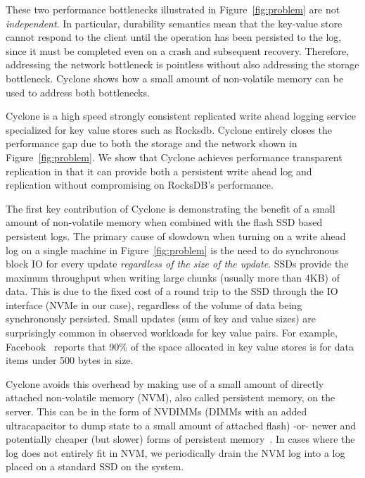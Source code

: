 \documentclass[pageno]{jpaper}
\begin{document}
These two performance bottlenecks illustrated in Figure~\ref{fig:problem} are
not \emph{independent}. In particular, durability semantics mean that the
key-value store  cannot respond to the client until the operation has been
persisted to the log, since it must be completed even on a crash and subsequent
recovery. Therefore, addressing the network bottleneck is pointless without also
addressing the storage bottleneck. Cyclone shows how a small amount of
non-volatile memory can be used to address both bottlenecks.

Cyclone is a high speed strongly consistent replicated write ahead logging
service specialized for key value stores such as Rocksdb. Cyclone entirely
closes the performance gap due to both the storage and the network shown in
Figure~\ref{fig:problem}. We show that Cyclone achieves performance transparent
replication in that it can provide both a persistent write ahead log and
replication without compromising on RocksDB's performance.

The first key contribution of Cyclone is demonstrating the benefit of a small
amount of non-volatile memory when combined with the flash SSD based persistent
logs.  The primary cause of slowdown when turning on a write ahead log on a
single machine in Figure~\ref{fig:problem} is the need to do synchronous block
IO for every update \emph{regardless of the size of the update}. SSDs provide
the maximum throughput when writing large chunks (usually more than 4KB) of
data. This is due to the fixed cost of a round trip to the SSD through the IO
interface (NVMe in our case), regardless of the volume of data being
synchronously persisted. Small updates (sum of key and value sizes) are
surprisingly common in observed workloads for key value pairs. For example,
Facebook~\cite{fb_workload_analysis} reports that 90\% of the space allocated in
key value stores is for data items under 500 bytes in size.

Cyclone avoids this overhead by making use of a small amount of directly
attached non-volatile memory (NVM), also called persistent memory, on the
server.  This can be in the form of NVDIMMs (DIMMs with an added ultracapacitor
to dump state to a small amount of attached flash) -or- newer and potentially
cheaper (but slower) forms of persistent memory~\cite{pmfs}.
In cases where the log does not entirely fit in NVM, we periodically drain the
NVM log into a log placed on a standard SSD on the system.
\end{document}
